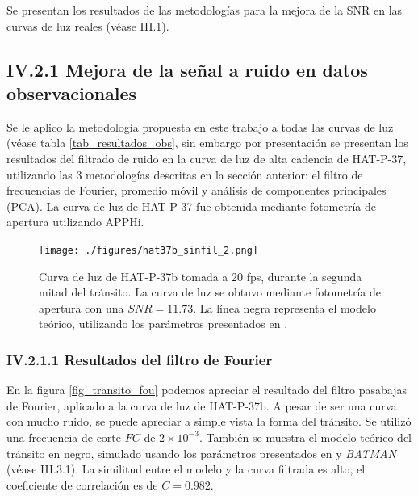 Se presentan los resultados de las metodologías para la mejora de la SNR en las curvas de luz reales (véase III.1).

\subsection*{IV.2.1 Mejora de la señal a ruido en datos observacionales}

Se le aplico la metodología propuesta en este trabajo a todas las curvas de luz (véase tabla \ref{tab_resultados_obs}, sin embargo por presentación se presentan los resultados del filtrado de ruido en la curva de luz de alta cadencia de HAT-P-37, utilizando las 3 metodologías descritas en la sección anterior: el filtro de frecuencias de Fourier, promedio móvil y análisis de componentes principales (PCA). La curva de luz de HAT-P-37 fue obtenida mediante fotometría de apertura utilizando APPHi.


\begin{figure}[h!]
	\centering
	  \texttt{[image: ./figures/hat37b\_sinfil\_2.png]}
	 \caption{Curva de luz de HAT-P-37b tomada a 20 fps, durante la segunda mitad del tránsito. La curva de luz se obtuvo mediante fotometría de apertura con una $SNR=11.73$. La línea negra representa el modelo teórico, utilizando los parámetros presentados en \cite{bakos2012hat}.}
	  \label{fig_transito_hat37b}
  \end{figure}


\subsubsection*{IV.2.1.1 Resultados del filtro de Fourier}

En la figura \ref{fig_transito_fou} podemos apreciar el resultado del filtro pasabajas de Fourier, aplicado a la curva de luz de HAT-P-37b. A pesar de ser una curva con mucho ruido, se puede apreciar a simple vista la forma del tránsito. Se utilizó una frecuencia de corte $FC$ de $2\times 10^{-3}$. También se muestra el modelo teórico del tránsito en negro, simulado usando los parámetros presentados en \cite{bakos2012hat} y \textit{BATMAN} (véase III.3.1). La similitud entre el modelo y la curva filtrada es alto, el coeficiente de correlación es de $C=0.982$.


